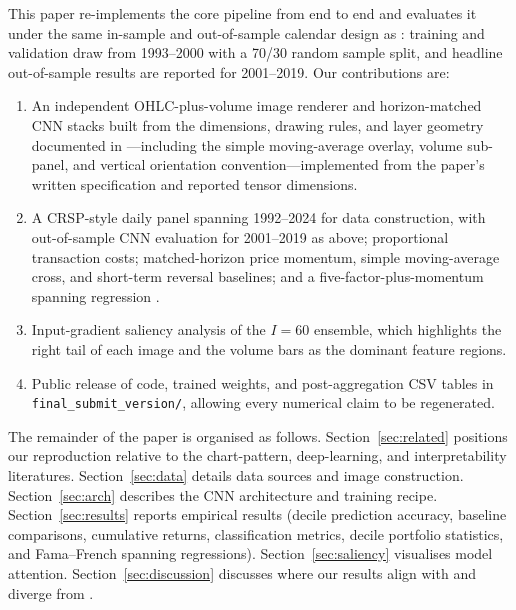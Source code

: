 \documentclass{article}
\begin{document}
This paper re-implements the core pipeline from end to end and evaluates it
under the same in-sample and out-of-sample calendar design as
\citet{jiang2023reimagining}: training and validation draw from 1993--2000
with a 70/30 random sample split, and headline out-of-sample results are
reported for 2001--2019. Our contributions are:
\begin{enumerate}
  \item An independent OHLC-plus-volume image renderer and horizon-matched CNN
        stacks built from the dimensions, drawing rules, and layer geometry
        documented in \citet{jiang2023reimagining}---including the simple
        moving-average overlay, volume sub-panel, and vertical orientation
        convention---implemented from the paper's written specification and
        reported tensor dimensions.
  \item A CRSP-style daily panel spanning 1992--2024 for data construction, with
        out-of-sample CNN evaluation for 2001--2019 as above; proportional transaction
        costs; matched-horizon price momentum, simple moving-average cross,
        and short-term reversal baselines; and a five-factor-plus-momentum
        spanning regression \citep{fama1993common,fama2015five,carhart1997persistence}.
  \item Input-gradient saliency analysis \citep{simonyan2014deep} of the
        $I=60$ ensemble, which highlights the right tail of each image and
        the volume bars as the dominant feature regions.
  \item Public release of code, trained weights, and post-aggregation CSV
        tables in \texttt{final\_submit\_version/}, allowing every numerical
        claim to be regenerated.
\end{enumerate}

The remainder of the paper is organised as follows. Section~\ref{sec:related}
positions our reproduction relative to the chart-pattern, deep-learning, and
interpretability literatures. Section~\ref{sec:data} details data sources and
image construction. Section~\ref{sec:arch} describes the CNN architecture and
training recipe. Section~\ref{sec:results} reports empirical results
(decile prediction accuracy, baseline comparisons, cumulative returns,
classification metrics, decile portfolio statistics, and Fama--French
spanning regressions). Section~\ref{sec:saliency} visualises model
attention. Section~\ref{sec:discussion} discusses where our results align
with and diverge from \citet{jiang2023reimagining}.
\end{document}
